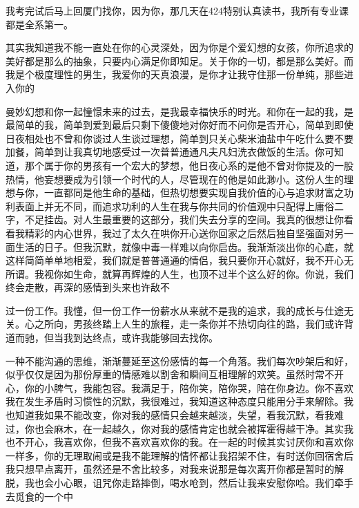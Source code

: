 \documentclass{article}
\begin{document}
我考完试后马上回厦门找你，因为你，那几天在424特别认真读书，我所有专业课都是全系第一。

其实我知道我不能一直处在你的心灵深处，因为你是个爱幻想的女孩，你所追求的美好都是那么的抽象，只要内心满足你即知足。关于你的一切，都是那么美好。而我是个极度理性的男生，我爱你的天真浪漫，是你才让我守住那一份单纯，那些进入你的

\newpage 

曼妙幻想和你一起憧憬未来的过去，是我最幸福快乐的时光。和你在一起的我，是最简单的我，简单到爱到最后只剩下傻傻地对你好而不问你是否开心，简单到即使日夜相处也不曾和你谈过人生谈过理想，简单到只关心柴米油盐中午吃什么要不要加餐，简单到让我真切地感受过一次普普通通凡夫凡妇洗衣做饭的生活。你可知道，那个属于你的男孩有一个宏大的梦想，他日夜心系的是他不曾对你提及的一股热情，他妄想要成为引领一个时代的人，尽管现在的他是如此渺小。这份人生的理想与你，一直都同是他生命的基础，但热切想要实现自我价值的心与追求财富之功利表面上并无不同，而追求功利的人生在我与你共同的价值观中只配得上庸俗二字，不足挂齿。对人生最重要的这部分，我们失去分享的空间。我真的很想让你看看我精彩的内心世界，我过了太久在哄你开心送你回家之后然后独自坚强面对另一面生活的日子。但我沉默，就像中毒一样难以向你启齿。我渐渐淡出你的心底，就这样简简单单地相爱，我们就是普普通通的情侣，我只要你开心就好，我不开心无所谓。我视你如生命，就算再辉煌的人生，也顶不过半个这么好的你。你说，我们终会走散，再深的感情到头来也许敌不

\newpage 

过一份工作。我懂，但一份工作一份薪水从来就不是我的追求，我的成长与仕途无关。心之所向，男孩终踏上人生的旅程，走一条你并不热切向往的路，我们或许背道而驰，但当我到达终点，或许我能够回去找你。

一种不能沟通的思维，渐渐蔓延至这份感情的每一个角落。我们每次吵架后和好，似乎仅仅是因为那份厚重的情感难以割舍和瞬间互相理解的欢笑。虽然时常不开心，你的小脾气，我能包容。我满足于，陪你笑，陪你哭，陪在你身边。你不喜欢我在发生矛盾时习惯性的沉默，我很难过，我知道这种态度只能用分手来解除。我也知道我如果不能改变，你对我的感情只会越来越淡，失望，看我沉默，看我难过，你也会麻木，在一起越久，你对我的感情肯定也就会被挥霍得越干净。其实我也不开心，我喜欢你，但我不喜欢喜欢你的我。在一起的时候其实讨厌你和喜欢你一样多，你的无理取闹或是我不能理解的情怀都让我招架不住，有时送你回宿舍后我只想早点离开，虽然还是不舍比较多，对我来说那是每次离开你都是暂时的解脱，我也会小心眼，诅咒你走路摔倒，喝水呛到，然后让我来安慰你哈。我们牵手去觅食的一个中

\newpage 
\end{document}
